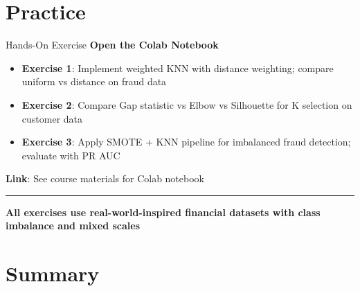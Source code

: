 \documentclass[8pt,aspectratio=169]{beamer}
\newcommand{\bottomnote}[1]{%
\vfill
\vspace{-2mm}
\textcolor{mllavender2}{\rule{\textwidth}{0.4pt}}
\vspace{1mm}
\footnotesize
\textbf{#1}
}
\begin{document}
\section{Practice}

\begin{frame}[t]{Hands-On Exercise}
\textbf{Open the Colab Notebook}
\begin{itemize}
\item \textbf{Exercise 1}: Implement weighted KNN with distance weighting; compare uniform vs distance on fraud data
\item \textbf{Exercise 2}: Compare Gap statistic vs Elbow vs Silhouette for K selection on customer data
\item \textbf{Exercise 3}: Apply SMOTE + KNN pipeline for imbalanced fraud detection; evaluate with PR AUC
\end{itemize}
\vspace{1em}
\textbf{Link}: See course materials for Colab notebook
\bottomnote{All exercises use real-world-inspired financial datasets with class imbalance and mixed scales}
\end{frame}

\section{Summary}
\end{document}
